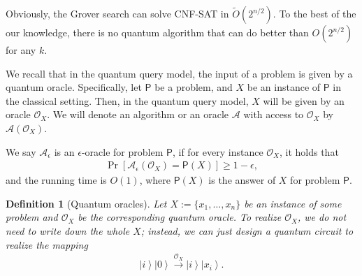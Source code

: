\documentclass[10pt,a4paper]{article}
\newtheorem{definition}[theorem]{Definition}
\newcommand{\wt}{\widetilde}
\newcommand{\A}{\mathcal{A}}
\renewcommand{\tilde}{\wt}
\newcommand{\ket}[1]{\left| #1 \right\rangle}
\newcommand{\ora}{\mathcal{O}}
\begin{document}
Obviously, the Grover search can solve \textsf{CNF-SAT} in $\tilde{O}(2^{n/2})$. To the best of the our knowledge, there is no quantum algorithm that can do better than $O(2^{n/2})$ for any $k$. 


We recall that in the quantum query model, the input of a problem is given by a quantum oracle. Specifically, let $\mathsf{P}$ be a problem, and $X$ be an instance of $\mathsf{P}$ in the classical setting. Then, in the quantum query model, $X$ will be given by an oracle $\ora_X$. We will denote an algorithm or an oracle $\A$ with access to $\ora_X$ by $\A(\ora_X)$. 

We say $\A_{\epsilon}$ is an $\epsilon$-oracle for problem $\mathsf{P}$, if for every instance $\ora_X$, it holds that
\begin{align}
    \Pr[\A_{\epsilon}(\ora_X) = \mathsf{P}(X)] \geq 1-\epsilon,
\end{align}
and the running time is $O(1)$, where $\mathsf{P}(X)$ is the answer of $X$ for problem $\mathsf{P}$. 

\begin{definition}[Quantum oracles]\label{def:oisgood}
Let $X:=\{x_1,\dots,x_n\}$ be an instance of some problem and $\ora_X$ be the corresponding quantum oracle. To realize $\ora_X$, we do not need to write down the whole $X$; instead, we can just design a quantum circuit to realize the mapping 
\begin{align}
    \ket{i}\ket{0} \xrightarrow{\ora_X} \ket{i}\ket{x_i}.
\end{align}  
\end{definition}
\end{document}
